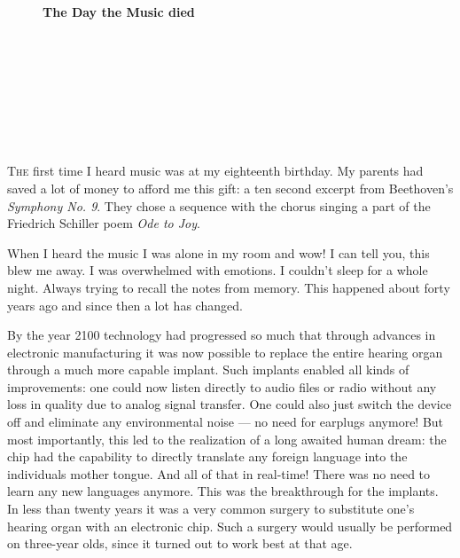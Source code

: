 \documentclass[11pt,paper=a5,pagesize,english,openright,twoside]{scrbook}
\begin{document}
\newpage \ \newpage

\thispagestyle{empty}
\ \newpage


\thispagestyle{empty}
\begin{figure}

\vspace*{3.0cm}
{\parindent0mm  

\center
	\hspace{0.0cm}
	\Large\textbf{The Day the Music died}\\
	\ \\
	\ \\
	\ \\
	\ \\
}
\ \\
\end{figure}



\pagebreak
\clearpage
\
\thispagestyle{empty}
\newpage


\setcounter{page}{1}
\frenchspacing
\lettrine[lines=3,lhang=0.21,nindent=0em,findent=0.1em]{T}{he}
first time I heard music was at my eighteenth birthday. My parents had
saved a lot of money to afford me this gift: a ten second excerpt from 
Beethoven's \textit{Symphony No. 9}. They chose a sequence with the chorus 
singing a part of the Friedrich Schiller poem \textit{Ode to Joy}.

When I heard the music I was alone in my room and wow! I can tell you,
this blew me away. I was overwhelmed with emotions. I couldn't sleep for a 
whole night. Always trying to recall the notes from memory. This happened 
about forty years ago and since then a lot has changed. 

By the year 2100 technology had progressed so much that through advances in
electronic manufacturing it was now possible to replace the entire hearing 
organ through a much more capable implant. Such implants enabled all kinds 
of improvements: one could now listen directly to audio files or radio without 
any loss in quality due to analog signal transfer. One could also just switch 
the device off and eliminate any environmental noise --- no need for earplugs 
anymore! 
But most importantly, this led to the realization of a long awaited human 
dream: the chip had the capability to directly translate any foreign language 
into the individuals mother tongue. And all of that in real-time! There was 
no need to learn any new languages anymore. 
This was the breakthrough for the implants. In less than twenty years it was 
a very common surgery to substitute one's hearing organ with an electronic
chip. Such a surgery would usually be performed on three-year olds, since
it turned out to work best at that age. 
\end{document}
